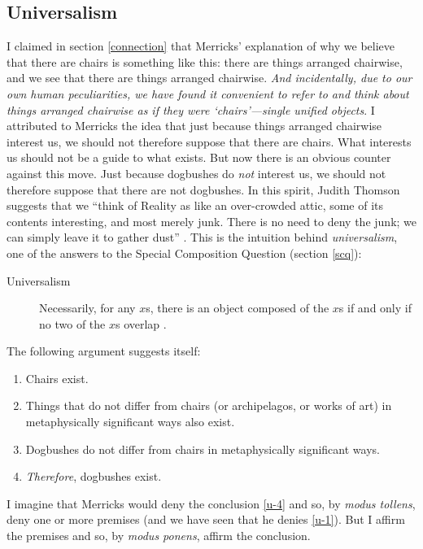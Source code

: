\documentclass[11pt]{article}
\begin{document}
\begin{spacing}{1.25}
\section{Universalism}
\label{universalism}
I claimed in section \ref{connection} that Merricks' explanation of
why we believe that there are chairs is something like this: there are
things arranged chairwise, and we see that there are things arranged
chairwise.  {\em And incidentally, due to our own human peculiarities,
  we have found it convenient to refer to and think about things
  arranged chairwise as if they were `chairs'---single unified
  objects}.  I attributed to Merricks the idea that just because
things arranged chairwise interest us, we should not therefore suppose
that there are chairs.  What interests us should not be a guide to
what exists.  But now there is an obvious counter against this move.
Just because dogbushes do {\em not} interest us, we should not
therefore suppose that there are not dogbushes.  In this spirit,
Judith Thomson suggests that we ``think of Reality as like an
over-crowded attic, some of its contents interesting, and most merely
junk.  There is no need to deny the junk; we can simply leave it to
gather dust'' \citep[167]{thomson1998a}.  This is the intuition behind
{\em universalism}, one of the answers to the Special Composition
Question (section \ref{scq}):

\begin{description}
\item[Universalism] Necessarily, for any $x$s, there is an object
  composed of the $x$s if and only if no two of the $x$s overlap
  \citep[227]{markosian1998a}.
\end{description}

The following argument suggests itself:

\begin{enumerate}[ref=(\arabic*)]
  \item Chairs exist. \label{u-1}
  \item Things that do not differ from chairs (or archipelagos, or
    works of art) in metaphysically significant ways also exist.
  \item Dogbushes do not differ from chairs in metaphysically
    significant ways.
  \item {\em Therefore}, dogbushes exist. \label{u-4}
\end{enumerate}

I imagine that Merricks would deny the conclusion \ref{u-4} and so, by
{\em modus tollens}, deny one or more premises (and we have seen that
he denies \ref{u-1}).  But I affirm the premises and so, by {\em modus
  ponens}, affirm the conclusion.


\end{spacing}
\end{document}
